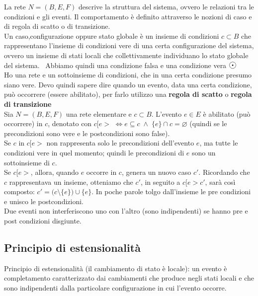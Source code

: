 La rete $N = (B, E, F)$ descrive la struttura del sistema, ovvero le relazioni tra le condizioni e gli eventi. 
Il comportamento è definito attraverso le nozioni di caso e di regola di scatto o di transizione.\\

Un caso,configurazione oppure stato globale è un insieme di condizioni $c \subset B$ che rappresentano l’insieme di condizioni vere di una certa configurazione del sistema, ovvero un insieme di stati locali che collettivamente individuano lo stato globale del sistema. \
Abbiamo quindi una condizione falsa \textbigcircle  e una condizione vera $\Large \astrosun$\\

Ho una rete e un sottoinsieme di condizioni, che in una certa condizione presumo siano vere. Devo quindi sapere dire quando un evento, data una certa condizione, può occorrere (essere abilitato), per farlo utilizzo una\textbf{ regola di scatto} o \textbf{regola di transizione} \\

Sia $N = (B, E, F)$ una rete elementare e $c \subset B$.
L’evento $e \in E$ è abilitato (può occorrere) in $c$, denotato con $c[e >$ $\iff $\textbullet$ e \subseteq c \; \land \; \{e $\textbullet$\} \cap c = \varnothing$ (quindi se le precondizioni sono vere e le postcondizioni sono false).\\
Se $c$ in $c[e >$ non rappresenta solo le precondizioni dell’evento $e$, ma tutte le condizioni vere in quel momento; quindi le precondizioni di $e$ sono un sottoinsieme di $c$.\\ 
Se $c[e >$, allora, quando $e$ occorre in $c$, genera un nuovo caso $c'$. Ricordando che $c$ rappresentava un insieme, otteniamo che $c'$, in seguito a $c[e > c'$, sarà così composto: $c' = (c \setminus \{$\textbullet$ e\}) \cup \{e $\textbullet$\}$. In poche parole tolgo dall'insieme le pre condizioni e unisco le postcondizioni.\\
Due eventi non interferiscono uno con l’altro (sono indipendenti) se hanno pre e post condizioni disgiunte.

\subsection{Principio di estensionalità}
Principio di estensionalità (il cambiamento di stato è locale): un evento è completamento caratterizzato dai cambiamenti che produce negli stati locali e che sono indipendenti dalla particolare configurazione in cui l’evento occorre.

